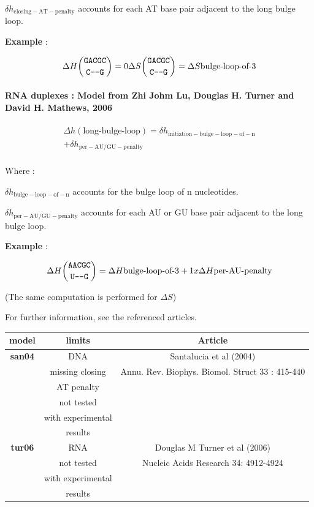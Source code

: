 \documentclass{article}
\begin{document}
$\delta{}h_\mathrm{closing-AT-penalty}$ accounts for each AT base pair adjacent
to the long bulge loop.

\textbf{Example} :

\begin{multline*}
\Delta H {\mbox{\texttt{GACGC}} \choose \mbox{\texttt{C---G}}} =
0
\Delta S {\mbox{\texttt{GACGC}} \choose \mbox{\texttt{C---G}}} =
\Delta S {\mbox{bulge-loop-of-3}} \\
\end{multline*}

\paragraph{RNA duplexes : \textbf{Model from Zhi Johm Lu, Douglas H. Turner and David H. Mathews, 2006}} 

\begin{multline*}
\Delta h {(\mbox{long-bulge-loop})} =
\delta{}h_\mathrm{initiation-bulge-loop-of-n} \\ +
\delta{}h_\mathrm{per-AU/GU-penalty}\\
\end{multline*}


Where :

$\delta{}h_\mathrm{bulge-loop-of-n}$ accounts for the bulge loop of n nucleotides.

$\delta{}h_\mathrm{per-AU/GU-penalty}$ accounts for each AU or GU base pair adjacent
to the long bulge loop.


\textbf{Example} :

\begin{multline*}
\Delta H {\mbox{\texttt{AACGC}} \choose \mbox{\texttt{U---G}}} =
\Delta H {\mbox{bulge-loop-of-3}} +
1 x \Delta H {\mbox{per-AU-penalty}} \\
\end{multline*}

       (The same computation is performed for $\Delta S$) 

For further information, see the referenced articles.

\begin{table}[h][c]
\begin{tabular}[h]{| c | c | c |}
\textbf{model} & \textbf{limits} & \textbf{Article} \\
\hline
\textbf{san04} & DNA & Santalucia et al (2004)\\
 & missing closing & Annu. Rev. Biophys. Biomol. Struct 33 : 415-440\\
 & AT penalty & \\
 & not tested & \\
 & with experimental & \\
 & results & \\
 \hline
\textbf{tur06} & RNA & Douglas M Turner et al (2006)\\
 & not tested & Nucleic Acids Research 34: 4912-4924 \\
 & with experimental & \\
 & results & \\
 \hline
\end{tabular}
\end{table}
\end{document}
